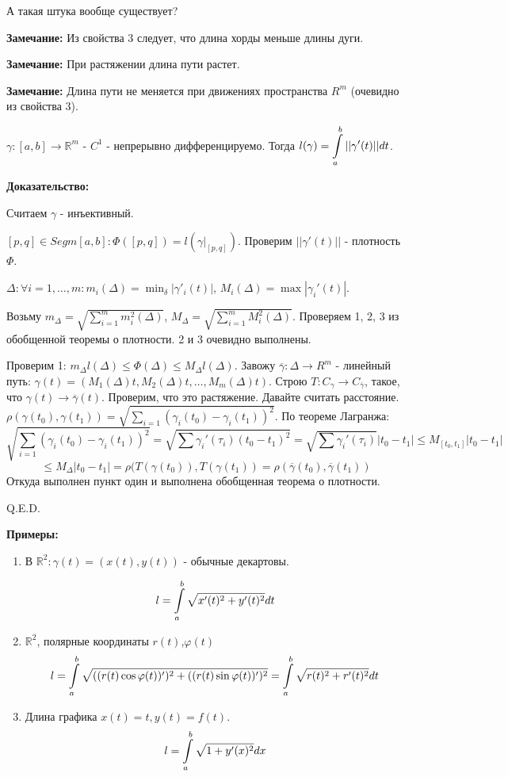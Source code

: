 А такая штука вообще существует? 
    
\textbf{Замечание:} Из свойства 3 следует, что длина хорды меньше длины дуги.

\textbf{Замечание:} При растяжении длина пути растет.

\textbf{Замечание:} Длина пути не меняется при движениях пространства $R^m$ (очевидно из свойства 3).


$\gamma: [a,b] \rightarrow \mathbb{R}^m$ - $C^1$ - непрерывно дифференцируемо. Тогда $l(\gamma) = \displaystyle\int\limits_{a}^{b}||\gamma'(t)||dt$.

\textbf{Доказательство:}

Считаем $\gamma$ - инъективный.

$[p,q]\in Segm[a,b]: \varPhi([p,q]) = l(\gamma\Big|_{[p,q]})$. Проверим $||\gamma'(t)||$ - плотность $\varPhi$.

$\Delta:\forall i = 1,\ldots,m: m_i(\Delta) = \min_{\delta} |\gamma'_{i}(t)|$, $M_i(\Delta) = \max|\gamma_i'(t)|$.

Возьму $m_{\Delta} = \sqrt{\sum\limits_{i=1}^m m_i^2(\Delta)}$, $M_{\Delta} = \sqrt{\sum\limits_{i=1}^m M_i^2(\Delta)}$. Проверяем 1, 2, 3 из обобщенной теоремы о плотности. 2 и 3 очевидно выполнены. 

Проверим 1: $m_{\Delta} l(\Delta) \leq \varPhi(\Delta)\leq M_\Delta l(\Delta)$. Завожу $\overline{\gamma}:\Delta \rightarrow R^m$ - линейный путь: $\gamma(t) = (M_1(\Delta)t,M_2(\Delta)t,\ldots,M_m(\Delta)t)$. Строю $T: C_{\gamma} \rightarrow C_{\overline{\gamma}}$, такое, что $\gamma(t) \rightarrow \overline{\gamma}(t)$. Проверим, что это растяжение. Давайте считать расстояние. $\rho(\gamma(t_0),\gamma(t_1)) = \sqrt{\sum\limits_{i=1}(\gamma_i(t_0)-\gamma_i(t_1))^2}$. По теореме Лагранжа: $$\sqrt{\sum\limits_{i=1}(\gamma_i(t_0)-\gamma_i(t_1))^2} =\sqrt{ \sum \gamma_i'(\tau_i)(t_0-t_1)^2} =\sqrt{\sum \gamma_i'(\tau_i)}|t_0-t_1| \leq M_{[t_0,t_1]}|t_0-t_1|$$
$$\leq M_{\Delta}|t_0-t_1| = \rho(T(\gamma(t_0)),T(\gamma(t_1)) =\rho(\overline{\gamma}(t_0),\overline{\gamma}(t_1))$$
Откуда выполнен пункт один и выполнена обобщенная теорема о плотности.


\hfill Q.E.D.

\textbf{Примеры:}
\begin{enumerate}
    \item В $\mathbb{R}^2:\gamma(t) = (x(t),y(t))$ - обычные декартовы.

    $$l = \displaystyle\int\limits_{a}^{b}\sqrt{x'(t)^2+y'(t)^2} dt$$
    \item $\mathbb{R}^2$, полярные координаты $r(t)$,$\varphi(t)$
    $$l = \displaystyle\int\limits_{a}^{b} \sqrt{((r(t) \cos \varphi(t))')^2+((r(t) \sin\varphi(t))')^2} = \displaystyle\int\limits_{a}^{b} \sqrt{r(t)^2+r'(t)^2}dt$$
    \item Длина графика $x(t) =t, y(t) = f(t)$. 
    $$l = \displaystyle\int\limits_{a}^{b}\sqrt{1 + y'(x)^2}dx$$
\end{enumerate}


